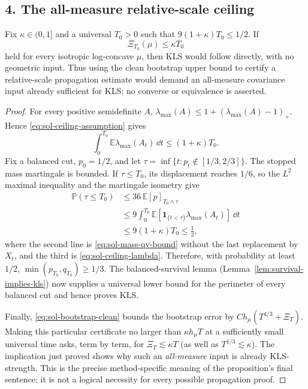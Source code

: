 \documentclass[../main.tex]{subfiles}
\begin{document}
\subsection*{4. The all-measure relative-scale ceiling}

\begin{proposition}
\label{prop:sol-ceiling}
Fix $\kappa\in(0,1]$ and a universal $T_0>0$ such that
$9(1+\kappa)T_0\leq1/2$.  If
\begin{equation}
  \Xi_{T_0}(\mu)\leq\kappa T_0
  \label{eq:sol-ceiling-assumption}
\end{equation}
held for every isotropic log-concave $\mu$, then KLS would follow directly, with no geometric
input.  Thus using the clean bootstrap upper bound to certify a relative-scale propagation
estimate would demand an all-measure covariance input already sufficient for KLS; no converse
or equivalence is asserted.
\end{proposition}

\begin{proof}
For every positive semidefinite $A$,
$\lambda_{\max}(A)\leq1+(\lambda_{\max}(A)-1)_+$.  Hence
\eqref{eq:sol-ceiling-assumption} gives
\begin{equation}
  \int_0^{T_0}\mathbb E\lambda_{\max}(A_t)\,\dd t
  \leq(1+\kappa)T_0.
  \label{eq:sol-ceiling-lambda}
\end{equation}
Fix a balanced cut, $p_0=1/2$, and let
$\tau=\inf\{t:p_t\notin[1/3,2/3]\}$.  The stopped mass martingale is bounded.  If
$\tau\leq T_0$, its displacement reaches $1/6$, so the $L^2$ maximal inequality and the
martingale isometry give
\[
\begin{split}
  \mathbb P(\tau\leq T_0)
  &\leq36\,\mathbb E[p]_{T_0\wedge\tau}\\
  &\leq9\int_0^{T_0}\mathbb E[\mathbf 1_{\{t<\tau\}}
                       \lambda_{\max}(A_t)]\,\dd t\\
  &\leq9(1+\kappa)T_0\leq\frac12,
\end{split}
\]
where the second line is \eqref{eq:sol-mass-qv-bound} without the last replacement by $X_t$,
and the third is \eqref{eq:sol-ceiling-lambda}.  Therefore, with probability at least $1/2$,
$\min(p_{T_0},q_{T_0})\geq1/3$.  The balanced-survival lemma
(Lemma~\ref{lem:survival-implies-kls}) now supplies a universal lower bound for the perimeter
of every balanced cut and hence proves KLS.

Finally, \eqref{eq:sol-bootstrap-clean} bounds the bootstrap error by
$C h_\mu(T^{4/3}+\Xi_T)$.  Making this particular certificate no larger than
$\kappa h_\mu T$ at a sufficiently small universal time asks, term by term, for
$\Xi_T\lesssim\kappa T$ (as well as $T^{1/3}\lesssim\kappa$).  The implication just proved
shows why such an \emph{all-measure} input is already KLS-strength.  This is the precise
method-specific meaning of the proposition's final sentence; it is not a logical necessity for
every possible propagation proof.
\end{proof}
\end{document}
